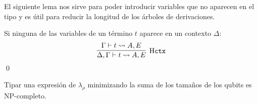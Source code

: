 El siguiente lema nos sirve para poder introducir variables que no aparecen en el tipo y es útil para reducir la longitud de los árboles de derivaciones.

\begin{lema}
    Si ninguna de las variables de un término $t$ aparece en un contexto $\Delta$: 
    \begin{equation*}
        \infer[\text{H}\mathtt{ctx}]
            {\Delta,\Gamma \vdash t \leadsto A,E}
            {\Gamma \vdash t\leadsto A,E}
    \end{equation*}\qed
\end{lema}
\begin{teorema}\label{teo:hindley_np}
    Tipar una expresión de $\lambda_\rho$ minimizando la suma de los tamaños de los qubits es NP-completo.
\end{teorema}
